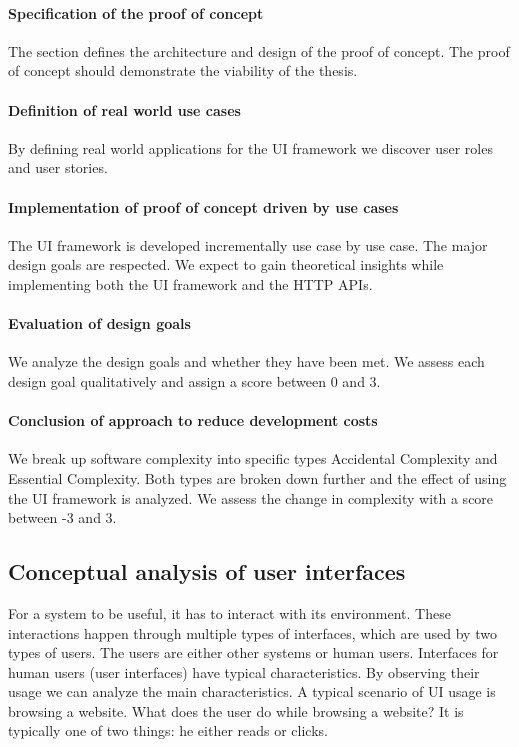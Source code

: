 \paragraph{Specification of the proof of concept}
The section defines the architecture and design of the proof of concept. The proof of concept should demonstrate the viability of the thesis.

\paragraph{Definition of real world use cases}
By defining real world applications for the UI framework we discover user roles and user stories.

\paragraph{Implementation of proof of concept driven by use cases}
The UI framework is developed incrementally use case by use case. The major design goals are respected. We expect to gain theoretical insights while implementing both the UI framework and the HTTP APIs.

\paragraph{Evaluation of design goals}
We analyze the design goals and whether they have been met. We assess each design goal qualitatively and assign a score between 0 and 3.

\paragraph{Conclusion of approach to reduce development costs}
We break up software complexity into specific types Accidental Complexity and Essential Complexity. Both types are broken down further and the effect of using the UI framework is analyzed. We assess the change in complexity with a score between -3 and 3.

\subsection{Conceptual analysis of user interfaces}
For a system to be useful, it has to interact with its environment. These interactions happen through multiple types of interfaces, which are used by two types of users. The users are either other systems or human users.
Interfaces for human users (user interfaces) have typical characteristics. By observing their usage we can analyze the main characteristics. A typical scenario of UI usage is browsing a website. What does the user do while browsing a website? It is typically one of two things: he either reads or clicks.

